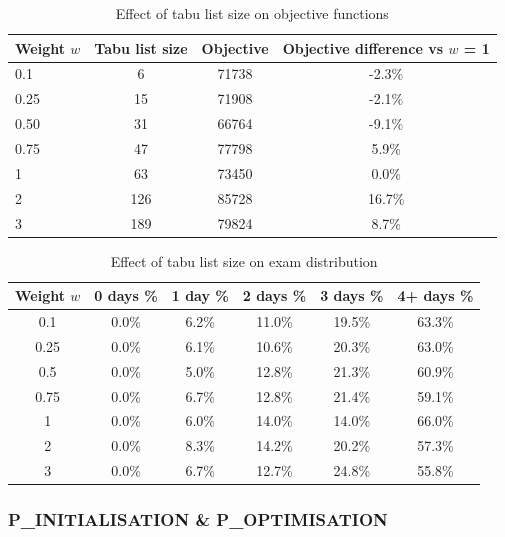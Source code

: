 \begin{table}[h]
	\caption{Effect of tabu list size on objective functions}
	\label{tab:tuning_tabu_obj}
	\centering
	\begin{tabular}{l c c c }
		\hline
  	\textbf{Weight $w$}	                & 
     	\textbf{Tabu list size}	                & 
    \textbf{Objective} & 
    \textbf{Objective difference vs $w$ = 1} \\ \hline
        0.1 & 6 & 71738 & -2.3\%  \\ 
        0.25& 15 & 71908 & -2.1\%  \\ 
        0.50 & 31 & 66764 & -9.1\%  \\ 
        0.75 & 47 & 77798 & 5.9\% \\
        1 & 63 &73450 & 0.0\% \\
        2 & 126 & 85728 & 16.7\% \\
        3 & 189 & 79824 & 8.7\% \\
        \hline
	\end{tabular}
\end{table}

\begin{table}[h]
	\caption{Effect of tabu list size on exam distribution}
	\label{tab:tuning_tabu_distr}
	\centering
	\begin{tabular}{c c c c c c}
		\hline
  	\textbf{Weight $w$}	&
   \textbf{0 days \% } &
    \textbf{1 day \% } & 
    \textbf{2 days \% } &
    \textbf{3 days \% } & 
    \textbf{4+ days \%}\\ \hline
    0.1 & 0.0\% & 6.2\% & 11.0\% & 19.5\% & 63.3\% \\
    0.25 & 0.0\% & 6.1\% & 10.6\% & 20.3\% & 63.0\% \\
    0.5 & 0.0\% & 5.0\% & 12.8\% & 21.3\% & 60.9\% \\
    0.75 & 0.0\% & 6.7\% & 12.8\% & 21.4\% & 59.1\% \\
    1 & 0.0\% & 6.0\% & 14.0\% & 14.0\% & 66.0\% \\
    2 & 0.0\% & 8.3\% & 14.2\% & 20.2\% & 57.3\% \\
    3 & 0.0\% & 6.7\% & 12.7\% & 24.8\% & 55.8\% \\
        \hline
	\end{tabular}
\end{table}

\subsubsection{P\_INITIALISATION \& P\_OPTIMISATION}

